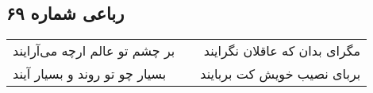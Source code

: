 \begin{center}
\section*{رباعی شماره ۶۹}
\label{sec:sh069}
\begin{longtable}{l p{0.5cm} r}
بر چشم تو عالم ارچه می‌آرایند
&&
مگرای بدان که عاقلان نگرایند
\\
بسیار چو تو روند و بسیار آیند
&&
بربای نصیب خویش کت بربایند
\\
\end{longtable}
\end{center}
